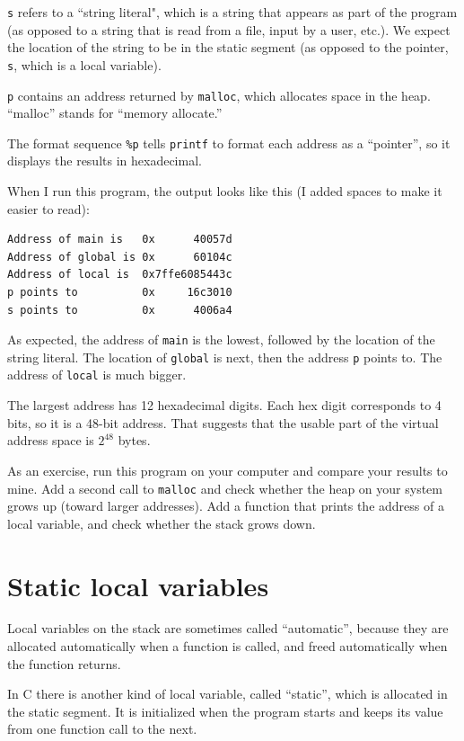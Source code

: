 \documentclass[12pt]{book}
\begin{document}
{\tt s} refers to a ``string literal", which is a string that appears
as part of the program (as opposed to a string that is read from a file,
input by a user, etc.).  We expect the location of the string to be
in the static segment (as opposed to the pointer, {\tt s}, which is
a local variable).

{\tt p} contains an address returned by {\tt malloc}, which allocates
space in the heap.  ``malloc'' stands for ``memory allocate.''

The format sequence \verb"%p" tells {\tt printf} to format each
address as a ``pointer'', so it displays the results in hexadecimal.

When I run this program, the output looks like this (I added spaces
to make it easier to read):

\begin{verbatim}
Address of main is   0x      40057d
Address of global is 0x      60104c
Address of local is  0x7ffe6085443c
p points to          0x     16c3010
s points to          0x      4006a4

\end{verbatim}

As expected, the address of {\tt main} is the lowest, followed by
the location of the string literal.  The location of
{\tt global} is next, then the address {\tt p} points to.
The address of {\tt local} is much bigger.

The largest address has 12 hexadecimal digits.  Each hex digit
corresponds to 4 bits, so it is a 48-bit address.  That suggests
that the usable part of the virtual address space is $2^{48}$ bytes.

As an exercise, run this program on your computer and compare your
results to mine.  Add a second call to {\tt malloc} and check whether
the heap on your system grows up (toward larger addresses).  Add a
function that prints the address of a local variable, and check
whether the stack grows down.


\section{Static local variables}

Local variables on the stack are sometimes called ``automatic'',
because they are allocated automatically when a function is called,
and freed automatically when the function returns.

In C there is another kind of local variable, called ``static'',
which is allocated in the static segment.  It is initialized when
the program starts and keeps its value from one function call to
the next.
\end{document}
